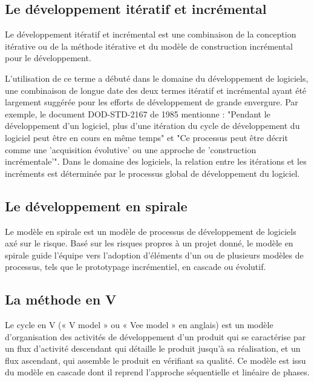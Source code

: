 \subsection{Le développement itératif et incrémental}\label{subsec:developpement-iteratif-et-incremental}
Le développement itératif et incrémental est une combinaison de la conception itérative ou de la méthode
itérative et du modèle de construction incrémental pour le développement.

L'utilisation de ce terme a débuté dans le domaine du développement de logiciels, une combinaison de
longue date des deux termes itératif et incrémental ayant été largement suggérée pour les efforts de
développement de grande envergure. Par exemple, le document DOD-STD-2167 de 1985 mentionne :
"Pendant le développement d'un logiciel, plus d'une itération du cycle de développement du logiciel
peut être en cours en même temps" et "Ce processus peut être décrit comme une 'acquisition évolutive'
ou une approche de 'construction incrémentale'". Dans le domaine des logiciels, la relation entre les
itérations et les incréments est déterminée par le processus global de développement du logiciel.

\subsection{Le développement en spirale}\label{subsec:developpement-en-spirale}

Le modèle en spirale est un modèle de processus de développement de logiciels axé sur le risque.
Basé sur les risques propres à un projet donné, le modèle en spirale guide l'équipe vers
l'adoption d'éléments d'un ou de plusieurs modèles de processus, tels que le prototypage incrémentiel,
en cascade ou évolutif.

\subsection{La méthode en V}\label{subsec:methode-en-v}
Le cycle en V (« V model » ou « Vee model » en anglais) est un modèle d'organisation des
activités de développement d'un produit qui se caractérise par un flux d'activité descendant
qui détaille le produit jusqu'à sa réalisation, et un flux ascendant, qui assemble le produit
en vérifiant sa qualité. Ce modèle est issu du modèle en cascade dont il reprend l'approche
séquentielle et linéaire de phases.

